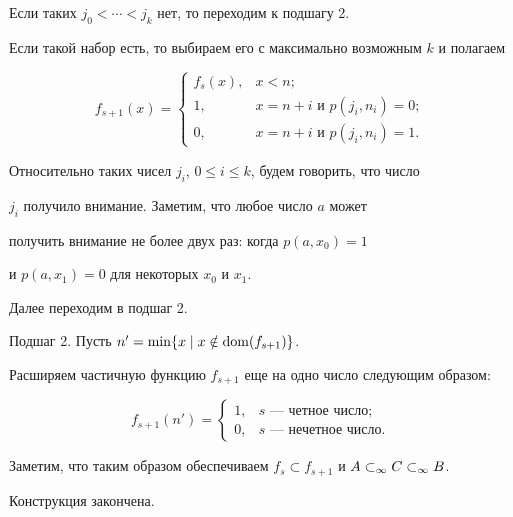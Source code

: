 \begin{pf}
\noindent{}Если таких $j_0<\dotsb<j_k$ нет, то переходим к подшагу 2.


Если такой набор есть, то выбираем его с максимально возможным $k$ и полагаем


$$


f_{s+1}(x)=


\begin{cases}


f_s(x), & x<n; \\


1, & x=n+i \text{ и } p(j_i,n_i)=0; \\


0, & x=n+i \text{ и } p(j_i,n_i)=1.


\end{cases}


$$


Относительно таких чисел $j_i$, $0\le i\le k$, будем говорить, что число


$j_i$ получило внимание. Заметим, что любое число $a$ может


получить внимание не более двух раз: когда $p(a,x_0)=1$


и $p(a,x_1)=0$ для некоторых $x_0$ и $x_1$.





Далее переходим в подшаг 2.





Подшаг 2. Пусть $n'=\min\{x\mid x\notin \operatorname{dom}(f_{s+1})\}$.


Расширяем частичную функцию $f_{s+1}$ еще на одно число следующим образом:


$$


f_{s+1}(n')=\begin{cases}


1, & s \text{ --- четное число}; \\


0, & s \text{ --- нечетное число}.


\end{cases}


$$





Заметим, что таким образом обеспечиваем $f_s\subset f_{s+1}$ и ${A}\subset_\infty{{C}\subset_\infty{B}}$.





Конструкция закончена.






\end{pf}
